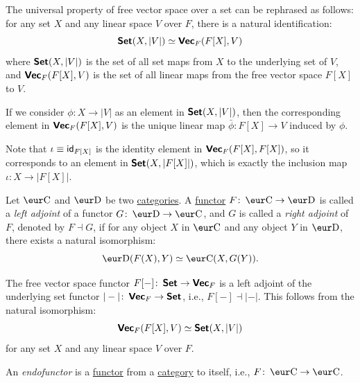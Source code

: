 \begin{remark}
  The universal property of free vector space over a set can be rephrased as follows: for any set $X$ and any linear space $V$ over $F$, there is a natural identification:
  \[
    \operatorname{\text{\normalfont\bf\sffamily Set}}(X, |V|) \simeq \operatorname{\text{\normalfont\bf\sffamily Vec}}_F(F[X], V)
  \]
  where $\operatorname{\text{\normalfont\bf\sffamily Set}}(X, |V|)$ is the set of all set maps from $X$ to the underlying set of $V$, and $\operatorname{\text{\normalfont\bf\sffamily Vec}}_F(F[X], V)$ is the set of all linear maps from the free vector space $F[X]$ to $V$.

  If we consider $\phi \colon X \to |V|$ as an element in $\operatorname{\text{\normalfont\bf\sffamily Set}}(X, |V|)$, then the corresponding element in $\operatorname{\text{\normalfont\bf\sffamily Vec}}_F(F[X], V)$ is the unique linear map $\bar{\phi} \colon F[X] \to V$ induced by $\phi$.

  Note that $\iota \equiv \operatorname{\text{\normalfont\sffamily id}}_{F[X]}$ is the identity element in $\operatorname{\text{\normalfont\bf\sffamily Vec}}_F(F[X], F[X])$, so it corresponds to an element in $\operatorname{\text{\normalfont\bf\sffamily Set}}(X, |F[X]|)$, which is exactly the inclusion map $\iota \colon X \to |F[X]|$.
\end{remark}

\begin{definition}\label{def:adjoint_functor}
  Let $\Ca$ and $\D$ be two \hyperref[def:category]{categories}. A \hyperref[def:functor]{functor} $F \colon \Ca \to \D$ is called a \emph{left adjoint} of a functor $G \colon \D \to \Ca$, and $G$ is called a \emph{right adjoint} of $F$, denoted by $F \dashv G$, if for any object $X$ in $\Ca$ and any object $Y$ in $\D$, there exists a natural isomorphism:
  \[
    \D(F(X), Y) \simeq \Ca(X, G(Y)).
  \]
\end{definition}

\begin{example}
  The free vector space functor $F[-] \colon \operatorname{\text{\normalfont\bf\sffamily Set}} \to \operatorname{\text{\normalfont\bf\sffamily Vec}}_F$ is a left adjoint of the underlying set functor $|-| \colon \operatorname{\text{\normalfont\bf\sffamily Vec}}_F \to \operatorname{\text{\normalfont\bf\sffamily Set}}$, i.e., $F[-] \dashv |-|$. This follows from the natural isomorphism:
  \[
    \operatorname{\text{\normalfont\bf\sffamily Vec}}_F(F[X], V) \simeq \operatorname{\text{\normalfont\bf\sffamily Set}}(X, |V|)
  \]
  for any set $X$ and any linear space $V$ over $F$.
\end{example}

\begin{definition}[Endofunctor]\label{def:endofunctor}
  An \emph{endofunctor} is a \hyperref[def:functor]{functor} from a \hyperref[def:category]{category} to itself, i.e., $F \colon \Ca \to \Ca$.
\end{definition}

